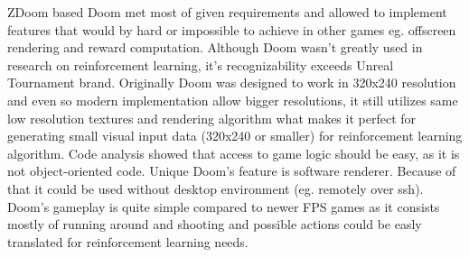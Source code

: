 ZDoom based Doom met most of given requirements and allowed to implement features that would by hard or impossible to achieve in other games eg. offscreen rendering and reward computation.
Although Doom wasn't greatly used in research on reinforcement learning, it's recognizability exceeds Unreal Tournament brand.
Originally Doom was designed to work in 320x240 resolution and even so modern implementation allow bigger resolutions, it still utilizes same low resolution textures and rendering algorithm what makes it perfect for generating small visual input data (320x240 or smaller) for reinforcement learning algorithm.
Code analysis showed that access to game logic should be easy, as it is not object-oriented code.
Unique Doom's feature is software renderer. Because of that it could be used without desktop environment (eg. remotely over ssh).
Doom's gameplay is quite simple compared to newer FPS games as it consists mostly of running around and shooting and possible actions could be easly translated for reinforcement learning needs. 
